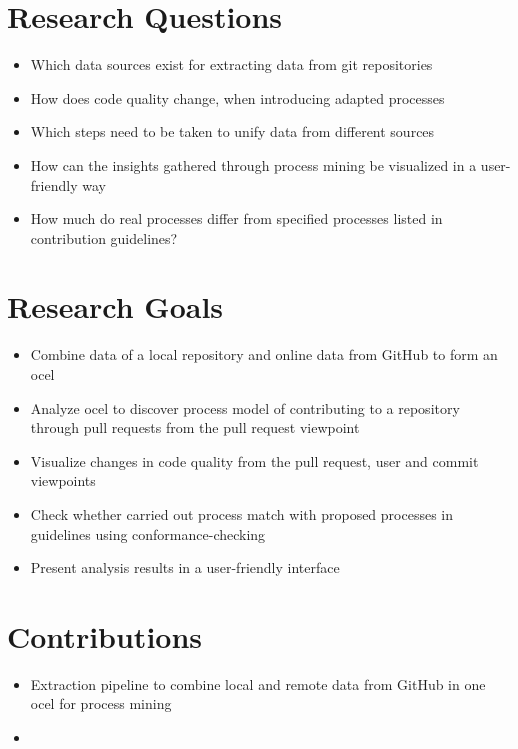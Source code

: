 \section{Research Questions}
\label{sec:intro_ssec:rqs}
\begin{itemize}
	\item Which data sources exist for extracting data from git repositories
	\item How does code quality change, when introducing adapted processes
	\item Which steps need to be taken to unify data from different sources
	\item How can the insights gathered through process mining be visualized in a user-friendly way
	\item How much do real processes differ from specified processes listed in contribution guidelines?
\end{itemize}

\section{Research Goals}
\label{sec:intro_ssec:rgs}
\begin{itemize}
	\item Combine data of a local repository and online data from GitHub to form an \ac{ocel}
	\item Analyze \ac{ocel} to discover process model of contributing to a repository through pull requests from the pull request viewpoint
	\item Visualize changes in code quality from the pull request, user and commit viewpoints
	\item Check whether carried out process match with proposed processes in guidelines using conformance-checking
	\item Present analysis results in a user-friendly interface
\end{itemize}


\section{Contributions}
\label{sec:intro_ssec:c}
\begin{itemize}
	\item Extraction pipeline to combine local and remote data from GitHub in one \ac{ocel} for process mining
	\item 
\end{itemize}


